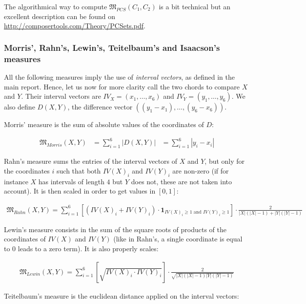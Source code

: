 \documentclass[a4paper,10pt]{article}
\begin{document}
The algorithmical way to compute $\mathfrak{M}_{PCS}(C_1,C_2)$ is a bit technical but an excellent description can be found on \href{http://composertools.com/Theory/PCSets.pdf}{http://composertools.com/Theory/PCSets.pdf}.


\subsubsection*{Morris', Rahn's, Lewin's, Teitelbaum's and Isaacson's measures}

All the following measures imply the use of \emph{interval vectors}, as defined in the main report. Hence, let us now for more clarity call the two chords to compare $X$ and $Y$. Their interval vectors are $IV_X=(x_1,\dots,x_6)$ and $IV_Y=(y_1,\dots,y_6)$. We also define $D(X,Y)$, the difference vector $((y_1-x_1),\dots,(y_6-x_6))$.

Morris' measure is the sum of absolute values of the coordinates of $D$:

\begin{align*}
\mathfrak{M}_{Morris}(X,Y)& = \sum_{i=1}^6 \left|D(X,Y)\right|& = \sum_{i=1}^6 \left|y_i-x_i\right|
\end{align*}

Rahn's measure sums the entries of the interval vectors of $X$ and $Y$, but only for the coordinates $i$ such that both $IV(X)_i$ and $IV(Y)_i$ are non-zero (if for instance $X$ has intervals of length $4$ but $Y$ does not, these are not taken into account). It is then scaled in order to get values in $[0,1]$:


\begin{align*}
\mathfrak{M}_{Rahn}(X,Y) = \sum_{i=1}^6 \left[\left(IV(X)_i+IV(Y)_i\right)\cdot\textbf{1}_{IV(X)_i\geq1\text{ and }IV(Y)_i\geq1}\right] \cdot \frac{2}{|X|(|X|-1)+|Y|(|Y|-1)}
\end{align*}

Lewin's measure consists in the sum of the square roots of products of the coordinates of $IV(X)$ and $IV(Y)$ (like in Rahn's, a single coordinate is equal to $0$ leads to a zero term). It is also properly scales:

\begin{align*}
\mathfrak{M}_{Lewin}(X,Y) = \sum_{i=1}^6 \left[\sqrt{IV(X)_i\cdot IV(Y)_i}\right] \cdot \frac{2}{\sqrt{|X|(|X|-1)|Y|(|Y|-1)}}
\end{align*}

Teitelbaum's measure is the euclidean distance applied on the interval vectors:
\end{document}

